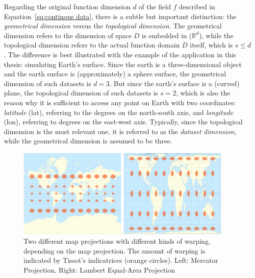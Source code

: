Regarding the original function dimension $d$ of the field $f$ described in Equation~\ref{eq:continous data}, there is a subtle but important distinction: the \textit{geometrical dimension} versus the \textit{topological dimension}. 
The geometrical dimension refers to the dimension of space $D$ is embedded in ($\mathbb{R}^d$), while the topological dimension refers to the actual function domain $D$ itself, which is $s\leq d$ \cite{telea2014data}.
The difference is best illustrated with the example of the application in this thesis: simulating Earth's surface. 
Since the earth is a three-dimensional object and the earth surface is (approximately) a sphere surface, the geometrical dimension of such datasets is $d=3$. 
But since the earth's surface is a (curved) plane, the topological dimension of such datasets is $s=2$, which is also the reason why it is sufficient to access any point on Earth with two coordinates: \textit{latitude} (lat), referring to the degrees on the north-south axis, and \textit{longitude} (lon), referring to degrees on the east-west axis.
Typically, since the topological dimension is the most relevant one, it is referred to as the \textit{dataset dimension}, while the geometrical dimension is assumed to be three. \cite{telea2014data}

\begin{figure}[htp]
  \begin{center}
    \includegraphics[width=0.95\textwidth]{figures/tissot-map-projections.png}
  \end{center}
  \caption[Examples Of map Projections Indicating Warping]{Two different map projections with different kinds of warping, depending on the map projection. The amount of warping is indicated by Tissot’s indicatrices (orange circles). Left: Mercator Projection, Right: Lambert Equal-Area Projection \cite{ghaderpour_map_2016}}\label{fig:tissot map projections}
\end{figure}


